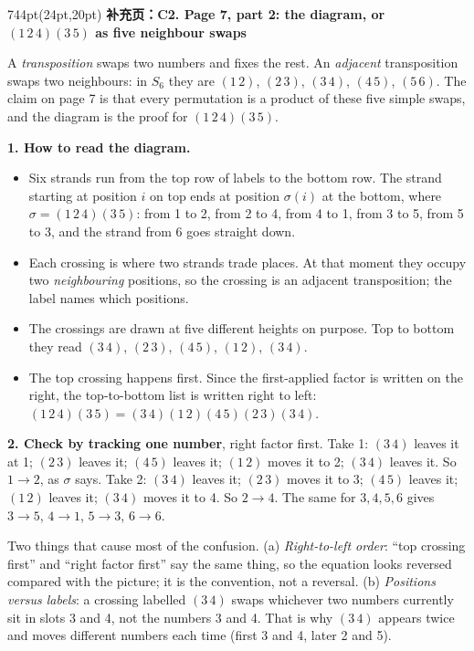 \documentclass[10pt]{article}
\newcommand{\interlude}[2]{%
  \begin{textblock*}{744pt}(24pt,20pt)
    {\sffamily\bfseries\large\color{big} 补充页：#1}\par\vspace{4pt}
    \small #2\end{textblock*}\mbox{}\clearpage}
\begin{document}
\interlude{C2. Page 7, part 2: the diagram, or $(1\,2\,4)(3\,5)$ as five neighbour swaps}{
\begin{minipage}[t]{744pt}\vspace{0pt}
\small
A \emph{transposition} swaps two numbers and fixes the rest. An \emph{adjacent} transposition swaps two neighbours: in $S_6$ they are $(1\,2)$, $(2\,3)$, $(3\,4)$, $(4\,5)$, $(5\,6)$. The claim on page 7 is that every permutation is a product of these five simple swaps, and the diagram is the proof for $(1\,2\,4)(3\,5)$.\par\vspace{6pt}
\begin{minipage}[t]{340pt}\vspace{0pt}
{\sffamily\bfseries 1. How to read the diagram.}
\begin{itemize}[nosep,leftmargin=*]
\item Six strands run from the top row of labels to the bottom row. The strand starting at position $i$ on top ends at position $\sigma(i)$ at the bottom, where $\sigma=(1\,2\,4)(3\,5)$: from 1 to 2, from 2 to 4, from 4 to 1, from 3 to 5, from 5 to 3, and the strand from 6 goes straight down.
\item Each crossing is where two strands trade places. At that moment they occupy two \emph{neighbouring} positions, so the crossing is an adjacent transposition; the label names which positions.
\item The crossings are drawn at five different heights on purpose. Top to bottom they read $(3\,4)$, $(2\,3)$, $(4\,5)$, $(1\,2)$, $(3\,4)$.
\item The top crossing happens first. Since the first-applied factor is written on the right, the top-to-bottom list is written right to left: $(1\,2\,4)(3\,5)=(3\,4)(1\,2)(4\,5)(2\,3)(3\,4)$.
\end{itemize}
\vspace{4pt}
{\sffamily\bfseries 2. Check by tracking one number}, right factor first. Take 1: $(3\,4)$ leaves it at 1; $(2\,3)$ leaves it; $(4\,5)$ leaves it; $(1\,2)$ moves it to 2; $(3\,4)$ leaves it. So $1\to2$, as $\sigma$ says. Take 2: $(3\,4)$ leaves it; $(2\,3)$ moves it to 3; $(4\,5)$ leaves it; $(1\,2)$ leaves it; $(3\,4)$ moves it to 4. So $2\to4$. The same for $3,4,5,6$ gives $3\to5$, $4\to1$, $5\to3$, $6\to6$.
\begin{pitfall}
Two things that cause most of the confusion. (a) \emph{Right-to-left order}: ``top crossing first'' and ``right factor first'' say the same thing, so the equation looks reversed compared with the picture; it is the convention, not a reversal. (b) \emph{Positions versus labels}: a crossing labelled $(3\,4)$ swaps whichever two numbers currently sit in slots 3 and 4, not the numbers 3 and 4. That is why $(3\,4)$ appears twice and moves different numbers each time (first 3 and 4, later 2 and 5).

\end{pitfall}
\end{minipage}
\end{minipage}}
\end{document}
